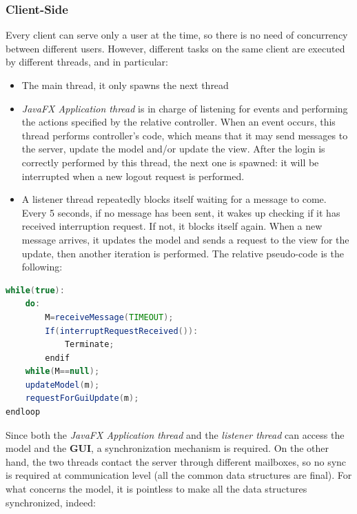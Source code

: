 \subsubsection{Client-Side}
Every client can serve only a user at the time, so there is no need of concurrency between different users. However, different tasks on the same client are executed by different threads, and in particular:
\begin{itemize}
	\item The main thread, it only spawns the next thread
	\item \textit{JavaFX Application thread} is in charge of listening for events and performing the actions specified by the relative controller. When an event occurs, this thread performs controller’s code, which means that it may send messages to the server, update the model and/or update the view. After the login is correctly performed by this thread, the next one is spawned: it will be interrupted when a new logout request is performed.
	\item A listener thread repeatedly blocks itself waiting for a message to come. Every 5 seconds, if no message has been sent, it wakes up checking if it has received interruption request. If not, it blocks itself again. When a new message arrives, it updates the model and sends a request to the view for the update, then another iteration is performed. The relative pseudo-code is the following:
\end{itemize}

\begin{lstlisting}[language=java]
while(true):
	do:
		M=receiveMessage(TIMEOUT);
		If(interruptRequestReceived()):
			Terminate;
		endif
	while(M==null);
	updateModel(m);
	requestForGuiUpdate(m);
endloop
\end{lstlisting}
Since both the  \textit{JavaFX Application thread} and the \textit{listener thread} can access the model and the \textbf{GUI}, a synchronization mechanism is required. On the other hand, the two threads contact the server through different mailboxes, so no sync is required at communication level (all the common data structures are final).
For what concerns the model, it is pointless to make all the data structures synchronized, indeed:

